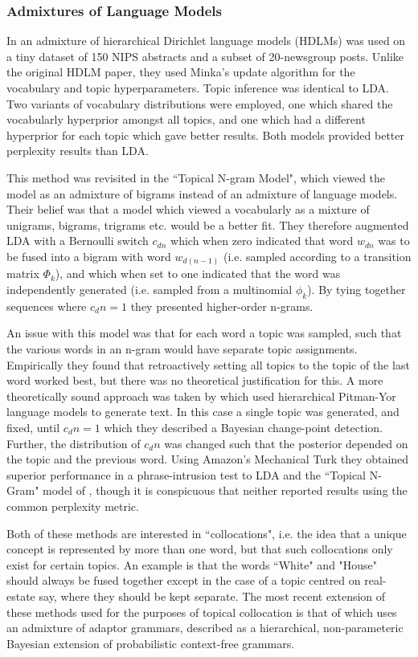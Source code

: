 \subsubsection{Admixtures of Language Models}
In \cite{Wallach2006} an admixture of hierarchical Dirichlet language models (HDLMs)\cite{MacKay1995} was used on a tiny dataset of 150 NIPS abstracts and a subset of 20-newsgroup posts. Unlike the original HDLM paper, they used Minka's update algorithm\cite{Minka2002} for the vocabulary and topic hyperparameters. Topic inference was identical to LDA. Two variants of vocabulary distributions were employed, one which shared the vocabularly hyperprior amongst all topics, and one which had a different hyperprior for each topic which gave better results. Both models provided better perplexity results than LDA.

This method was revisited in the ``Topical N-gram Model"\cite{Wang2007}, which viewed the model as an admixture of bigrams instead of an admixture of language models. Their belief was that a model which viewed a vocabularly as a mixture of unigrams, bigrams, trigrams etc. would be a better fit. They therefore augmented LDA with a Bernoulli switch $c_{dn}$ which when zero indicated that word $w_{dn}$ was to be fused into a bigram with word $w_{d(n-1)}$ (i.e. sampled according to a transition matrix $\Phi_k$), and which when set to one indicated that the word was independently generated (i.e. sampled from a multinomial $\phi_k$). By tying together sequences where $c_dn=1$ they presented higher-order n-grams.

An issue with this model was that for each word a topic was sampled, such that the various words in an n-gram would have separate topic assignments. Empirically they found that retroactively setting all topics to the topic of the last word worked best, but there was no theoretical justification for this. A more theoretically sound approach was taken by \cite{Lindsey2012} which used hierarchical Pitman-Yor language models to generate text. In this case a single topic was generated, and fixed, until $c_dn=1$ which they described a Bayesian change-point detection. Further, the distribution of $c_dn$ was changed such that the posterior depended on the topic and the previous word. Using Amazon's Mechanical Turk they obtained superior performance in a phrase-intrusion test to LDA and the ``Topical N-Gram" model of \cite{Wang2007}, though it is conspicuous that neither reported results using the common perplexity metric.

Both of these methods are interested in ``collocations", i.e. the idea that a unique concept is represented by more than one word, but that such collocations only exist for certain topics. An example is that the words ``White" and "House" should always be fused together except in the case of a topic centred on real-estate say, where they should be kept separate. The most recent extension of these methods used for the purposes of topical collocation is that of \cite{Johnson2010} which uses an admixture of adaptor grammars, described as a hierarchical, non-parameteric Bayesian extension of probabilistic context-free grammars.

